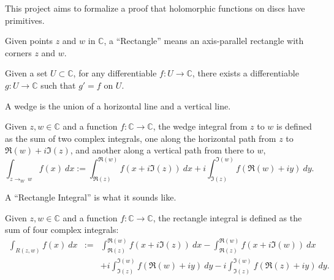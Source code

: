 
This project aims to formalize a proof that holomorphic functions on discs have primitives.



\begin{definition}[Rectangle]
  \label{Rectangle}
  \leanok
    Given points $z$ and $w$ in $\mathbb C$, a ``Rectangle'' means an axis-parallel rectangle with
    corners $z$ and $w$.
\end{definition}



\begin{definition}
  \label{HasPrimitives}
  \leanok
  Given a set $U\subset\mathbb C$, for any differentiable $f:U\to\mathbb C$, there exists a
  differentiable $g:U\to\mathbb C$ such that $g'=f$ on $U$.
\end{definition}



A wedge is the union of a horizontal line and a vertical line.

\begin{definition}
  \label{WedgeInt}
  \leanok
  Given $z,w\in\mathbb C$ and a function $f:\mathbb C\to\mathbb C$, the wedge integral from
  $z$ to $w$ is defined as the sum of two complex integrals, one along the horizontal path
  from $z$ to $\Re(w)+i \Im(z)$, and another along a vertical path from there to $w$,
   \begin{equation}
      \int_{z\to_W\  w} f(x)\ dx
      :=
      \int_{\Re(z)}^{\Re(w)} f(x+i\Im(z))\ dx
      +
      i\int_{\Im(z)}^{\Im(w)} f(\Re(w)+iy)\ dy
      .
   \end{equation}
\end{definition}



A ``Rectangle Integral'' is what it sounds like.

\begin{definition}
  \label{RectangleIntegral}
  \leanok
  Given $z,w\in\mathbb C$ and a function $f:\mathbb C\to\mathbb C$, the rectangle integral is
  defined as the sum of four complex integrals:
   \begin{eqnarray}
      \int_{R(z,w)} f(x)\ dx
      &:=&
      \int_{\Re(z)}^{\Re(w)} f(x+i\Im(z))\ dx
      -
      \int_{\Re(z)}^{\Re(w)} f(x+i\Im(w))\ dx
      \\
      &&+
      i\int_{\Im(z)}^{\Im(w)} f(\Re(w)+iy)\ dy
      -
      i\int_{\Im(z)}^{\Im(w)} f(\Re(z)+iy)\ dy
      .
   \end{eqnarray}
\end{definition}




